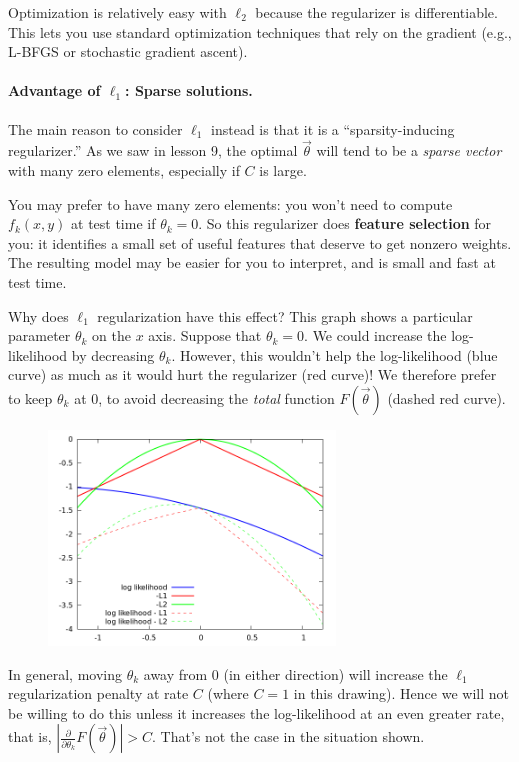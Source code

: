 \documentclass[11pt]{article}
\newcommand{\vtheta}{\vec{\theta}}
\newcommand{\diffk}{\frac{\partial}{\partial \theta_k}}
\begin{document}
Optimization is relatively easy with $\ell_2$ because the regularizer
is differentiable.  This lets you use standard optimization techniques
that rely on the gradient (e.g., L-BFGS or stochastic gradient ascent).

\paragraph{Advantage of $\ell_1$:  Sparse solutions.}  The main reason to consider $\ell_1$ instead is that it is a ``sparsity-inducing regularizer.''  As we saw in lesson 9, the optimal $\vtheta$ will tend to be a {\em sparse vector} with many zero elements, especially if $C$ is large.

You may prefer to have many zero elements: you won't need to compute $f_k(x,y)$ at test time if $\theta_k=0$.  So this regularizer does {\bf feature selection} for you: it identifies a small set of useful features that deserve to get nonzero weights.  The resulting model may be easier for you to interpret, and is small and fast at test time.

Why does $\ell_1$ regularization have this effect?  This graph shows a particular parameter $\theta_k$ on the $x$ axis.  Suppose that $\theta_k=0$.  We could increase the log-likelihood by decreasing $\theta_k$.  However, this wouldn't help the log-likelihood (blue curve) as much as it would hurt the regularizer (red curve)!  We therefore prefer to keep $\theta_k$ at 0, to avoid decreasing the {\em total} function $F(\vtheta)$ (dashed red curve).

\begin{figure}
\includegraphics[width=3in]{L1-L2}
\end{figure}

In general, moving $\theta_k$ away from 0 (in either direction) will increase the $\ell_1$ regularization penalty at rate $C$ (where $C=1$ in this drawing).  Hence we will not be willing to do this unless it increases the log-likelihood at an even greater rate, that is, $|\diffk F(\vtheta)| > C$.  That's not the case in the situation shown.
\end{document}
